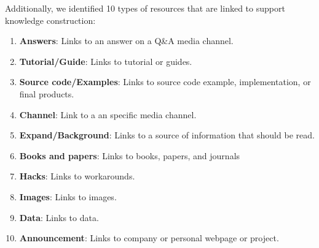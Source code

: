 \documentclass{sig-alternate-05-2015}
\begin{document}
	Additionally, we identified 10 types of resources that are linked to support knowledge construction:
	\begin{enumerate}[\bfseries (1)]
		\item \textbf{Answers}: Links to an answer on a Q\&A media channel.
		\item \textbf{Tutorial/Guide}: Links to tutorial or guides.
		\item \textbf{Source code/Examples}: Links to source code example, implementation, or final products.
		\item \textbf{Channel}: Link to a an specific media channel.
		\item \textbf{Expand/Background}: Links to a source of information that should be read.
		\item \textbf{Books and papers}: Links to books, papers, and journals
		\item \textbf{Hacks}: Links to workarounds.
		\item \textbf{Images}: Links to images.
		\item \textbf{Data}: Links to data.
		\item \textbf{Announcement}: Links to company or personal webpage or project.
	\end{enumerate}



\end{document}
